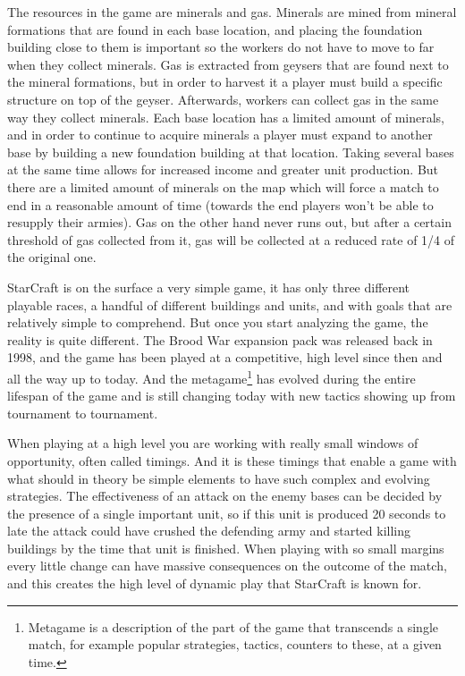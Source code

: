 The resources in the game are minerals and gas. Minerals are mined from mineral
formations that are found in each base location, and placing the foundation
building close to them is important so the workers do not have to move to far
when they collect minerals. Gas is extracted from geysers that are found next to
the mineral formations, but in order to harvest it a player must build a
specific structure on top of the geyser. Afterwards, workers can collect gas in
the same way they collect minerals. Each base location has a limited amount of
minerals, and in order to continue to acquire minerals a player must expand to
another base by building a new foundation building at that location. Taking
several bases at the same time allows for increased income and greater unit
production. But there are a limited amount of minerals on the map which will
force a match to end in a reasonable amount of time (towards the end players
won't be able to resupply their armies). Gas on the other hand never runs out,
but after a certain threshold of gas collected from it, gas will be collected at
a reduced rate of 1/4 of the original one.

StarCraft is on the surface a very simple game, it has only three different
playable races, a handful of different buildings and units, and with goals that
are relatively simple to comprehend. But once you start analyzing the game, the
reality is quite different. The Brood War expansion pack was released back in
1998, and the game has been played at a competitive, high level since then and
all the way up to today. And the metagame\footnote{Metagame is a description of
the part of the game that transcends a single match, for example popular
strategies, tactics, counters to these, at a given time.} has evolved during the
entire lifespan of the game and is still changing today with new tactics showing
up from tournament to tournament. \cite{starcraft}

When playing at a high level you are working with really small windows of
opportunity, often called timings. And it is these timings that enable a game
with what should in theory be simple elements to have such complex and evolving
strategies. The effectiveness of an attack on the enemy bases can be decided by
the presence of a single important unit, so if this unit is produced 20 seconds
to late the attack could have crushed the defending army and started killing
buildings by the time that unit is finished. When playing with so small margins
every little change can have massive consequences on the outcome of the match,
and this creates the high level of dynamic play that StarCraft is known for.
 
